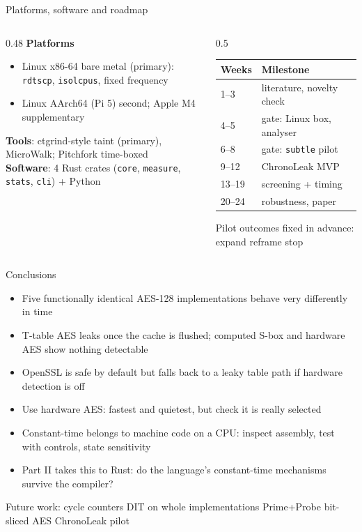 \documentclass[aspectratio=169,11pt]{beamer}
\newcommand{\code}[1]{\texttt{#1}}
\begin{document}
\begin{frame}{Platforms, software and roadmap}
\begin{columns}[T]
\begin{column}{0.48\textwidth}
\small
\textbf{Platforms}
\begin{itemize}
  \item Linux x86-64 bare metal (primary): \code{rdtscp}, \code{isolcpus}, fixed frequency
  \item Linux AArch64 (Pi 5) second; Apple M4 supplementary
\end{itemize}
\textbf{Tools}: ctgrind-style taint (primary), MicroWalk; Pitchfork time-boxed\\[3pt]
\textbf{Software}: 4 Rust crates (\code{core}, \code{measure}, \code{stats}, \code{cli}) + Python
\end{column}
\begin{column}{0.5\textwidth}
\small
\renewcommand{\arraystretch}{1.08}
\begin{tabular}{@{}ll@{}}
\toprule
Weeks & Milestone \\
\midrule
1--3 & literature, novelty check \\
4--5 & \alert{gate}: Linux box, analyser \\
6--8 & \alert{gate}: \code{subtle} pilot \\
9--12 & ChronoLeak MVP \\
13--19 & screening + timing \\
20--24 & robustness, paper \\
\bottomrule
\end{tabular}

\vspace{0.1cm}
{\scriptsize Pilot outcomes fixed in advance: expand \textbullet{} reframe \textbullet{} stop}
\end{column}
\end{columns}
\end{frame}

\begin{frame}{Conclusions}
\begin{itemize}
  \item Five functionally identical AES-128 implementations behave very differently in time
  \item T-table AES leaks once the cache is flushed; computed S-box and hardware AES show nothing detectable
  \item OpenSSL is safe by default but falls back to a leaky table path if hardware detection is off
  \item \alert{Use hardware AES}: fastest and quietest, but check it is really selected
  \item \alert{Constant-time belongs to machine code on a CPU}: inspect assembly, test with controls, state sensitivity
  \item Part II takes this to Rust: do the language's constant-time mechanisms survive the compiler?
\end{itemize}
\vspace{0.2cm}
{\small Future work: cycle counters \textbullet{} DIT on whole implementations \textbullet{} Prime+Probe \textbullet{} bit-sliced AES \textbullet{} ChronoLeak pilot}
\end{frame}
\end{document}
